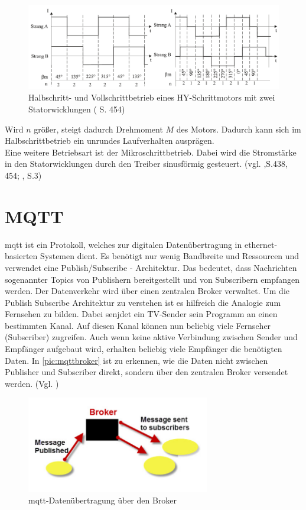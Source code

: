 \begin{figure}[h]
	\begin{center}
		\includegraphics[width=16cm]{schrittbetrieb.png}
		\caption{Halbschritt- und Vollschrittbetrieb eines HY-Schrittmotors mit zwei Statorwicklungen (\cite{kleinantriebe} S. 454)}
		\label{pic:schrittbetrieb}
	\end{center}
\end{figure}


Wird $n$ größer, steigt dadurch Drehmoment $M$ des Motors. Dadurch kann sich im Halbschrittbetrieb ein unrundes Laufverhalten ausprägen. \\
Eine weitere Betriebsart ist der Mikroschrittbetrieb. Dabei wird die Stromstärke in den Statorwicklungen durch den Treiber sinusförmig gesteuert. (vgl. \cite{kleinantriebe},S.438, 454; \cite{schrittmotorBa}, S.3)

\newpage
\section{MQTT} %
\acrshort{mqtt} ist ein Protokoll, welches zur digitalen Datenübertragung in ethernet-basierten Systemen dient. Es benötigt nur wenig Bandbreite und Ressourcen und verwendet eine 
Publish/Subscribe - Architektur. Das bedeutet, dass Nachrichten sogenannter Topics von Publishern bereitgestellt und von Subscribern empfangen werden. Der Datenverkehr wird über einen 
zentralen Broker verwaltet. Um die Publish Subscribe Architektur zu verstehen ist es hilfreich die Analogie zum Fernsehen zu bilden. Dabei senjdet ein TV-Sender sein Programm an einen bestimmten Kanal.
Auf diesen Kanal können nun beliebig viele Fernseher (Subscriber) zugreifen. Auch wenn keine aktive Verbindung zwischen Sender und Empfänger aufgebaut wird, erhalten beliebig viele Empfänger die benötigten Daten.
In \autoref{pic:mqttbroker} ist zu erkennen, wie die Daten nicht zwischen Publisher und Subscriber direkt, sondern über den zentralen Broker versendet werden. (Vgl. \cite{mqtt})

\begin{figure}[h]
    \begin{center}
        \includegraphics[width=8cm]{mqttbroker.png}
        \caption{\acrshort{mqtt}-Datenübertragung über den Broker}
        \label{pic:mqttbroker}
    \end{center}
\end{figure}